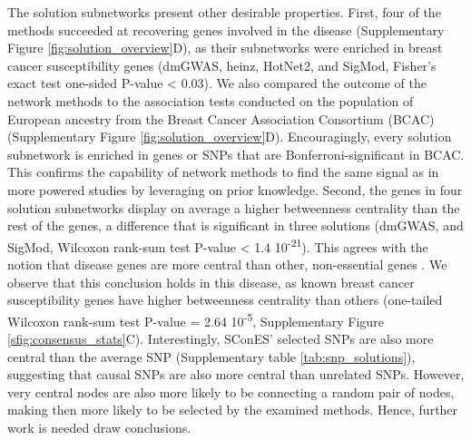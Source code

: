 \documentclass[twocolumn, 10pt]{article}
\begin{document}
The solution subnetworks present other desirable properties. First, four of the methods succeeded at recovering genes involved in the disease (Supplementary Figure \ref{fig:solution_overview}D), as their subnetworks were enriched in breast cancer susceptibility genes (dmGWAS, heinz, HotNet2, and SigMod, Fisher's exact test one-sided P-value < 0.03). We also compared the outcome of the network methods to the association tests conducted on the population of European ancestry from the Breast Cancer Association Consortium (BCAC) \cite{michailidou_genome-wide_2015} (Supplementary Figure \ref{fig:solution_overview}D). Encouragingly, every solution subnetwork is enriched in genes or SNPs that are Bonferroni-significant in BCAC. This confirms the capability of network methods to find the same signal as in more powered studies by leveraging on prior knowledge. Second, the genes in four solution subnetworks display on average a higher betweenness centrality than the rest of the genes, a difference that is significant in three solutions (dmGWAS, and SigMod, Wilcoxon rank-sum test P-value < 1.4 \texttimes{} 10\textsuperscript{-21}). This agrees with the notion that disease genes are more central than other, non-essential genes \cite{pinero_uncovering_2016}. We observe that this conclusion holds in this disease, as known breast cancer susceptibility genes have higher betweenness centrality than others (one-tailed Wilcoxon rank-sum test P-value = 2.64 \texttimes{} 10\textsuperscript{-5}, Supplementary Figure \ref{sfig:consensus_stats}C). Interestingly, SConES' selected SNPs are also more central than the average SNP (Supplementary table \ref{tab:snp_solutions}), suggesting that causal SNPs are also more central than unrelated SNPs. However, very central nodes are also more likely to be connecting a random pair of nodes, making then more likely to be selected by the examined methods. Hence, further work is needed draw conclusions.
\end{document}

